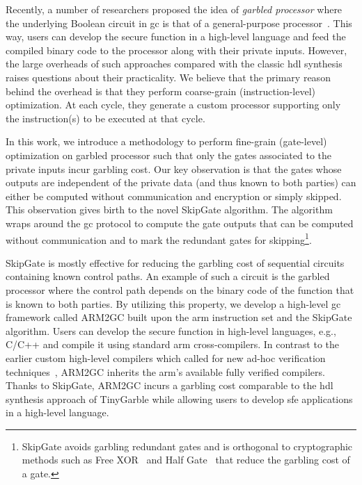Recently, a number of researchers proposed the idea of \textit{garbled processor} where the underlying Boolean circuit in \acrshort{gc} is that of a general-purpose processor~\cite{wang2016secure, songhori2016garbledcpu}.
This way, users can develop the secure function in a high-level language and feed the compiled binary code to the processor along with their private inputs.
However, the large overheads of such approaches compared with the classic \acrshort{hdl} synthesis raises questions about their practicality.
We believe that the primary reason behind the overhead is that they perform coarse-grain (instruction-level) optimization.
At each cycle, they generate a custom processor supporting only the instruction(s) to be executed at that cycle.

In this work, we introduce a methodology to perform fine-grain (gate-level) optimization on garbled processor such that only the gates associated to the private inputs incur garbling cost.
Our key observation is that the gates whose outputs are independent of the private data (and thus known to both parties) can either be computed without communication and encryption or simply skipped.
This observation gives birth to the novel SkipGate algorithm.
The algorithm wraps around the \acrshort{gc} protocol to compute the gate outputs that can be computed without communication and to mark the redundant gates for skipping\footnote{SkipGate avoids garbling redundant gates and is orthogonal to cryptographic methods such as Free XOR~\cite{kolesnikov2008improved} and Half Gate~\cite{zahur2015two} that reduce the garbling cost of a gate.}.

SkipGate is mostly effective for reducing the garbling cost of sequential circuits~\cite{songhori2015tinygarble} containing known control paths.
An example of such a circuit is the garbled processor where the control path depends on the binary code of the function that is known to both parties.
By utilizing this property, we develop a high-level \acrshort{gc} framework called ARM2GC built upon the \acrshort{arm} instruction set and the SkipGate algorithm.
Users can develop the secure function in high-level languages, e.g., C/C++ and compile it using standard \acrshort{arm} cross-compilers.
In contrast to the earlier custom high-level compilers which called for new ad-hoc verification techniques~\cite{rastogi2014wysteria,demmler2015aby,liu2015oblivm,mood2016frigate}, ARM2GC inherits the \acrshort{arm}'s available fully verified compilers.
Thanks to SkipGate, ARM2GC incurs a garbling cost comparable to the \acrshort{hdl} synthesis approach of TinyGarble while allowing users to develop \acrshort{sfe} applications in a high-level language.

